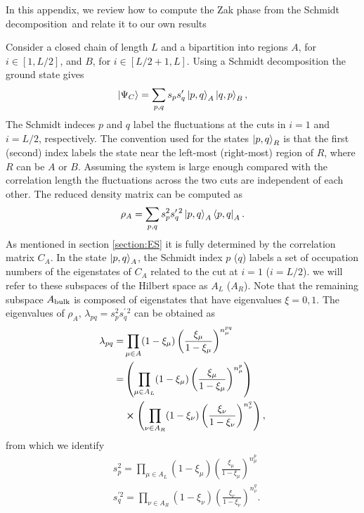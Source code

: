 \documentclass[twocolumn,amsmath,longbibliography,amssymb,superscriptaddress]{revtex4-1}
\newcommand{\maria}[1]{{\color{blue} #1}}
\begin{document}
\maria{In this appendix, we review  how to compute the Zak phase from the Schmidt decomposition~\cite{Zaletel2014}and relate it to our own results}


Consider a closed chain of length $L$ and a bipartition into regions $A$, for $i\in [1,L/2]$, and $B$, for $i \in [L/2+1,L]$. Using a Schmidt decomposition the ground state gives
\begin{equation}
\ket{\Psi_C} = \sum_{p,q} s_p s'_q \ket{p,q}_A \ket{q,p}_B,
\end{equation}
The Schmidt indeces $p$ and $q$ label the fluctuations at the cuts in $i=1$ and $i=L/2$, respectively. The convention used for the states $\ket{p,q}_{R}$ is that the first (second) index labels the state near the left-most (right-most) region of $R$, where $R$ can be $A$ or $B$. Assuming the system is large enough compared with the correlation length the fluctuations across the two cuts are independent of each other. The reduced density matrix can be computed as
\begin{equation}
\rho_A = \sum_{p,q} s_p^2 s^{\prime \, 2}_q \ket{p,q}_{A}\bra{p,q}_A .
\end{equation}
As mentioned in section \ref{section:ES} it is fully determined by the correlation matrix $C_A$. In the state $\ket{p,q}_A$, the Schmidt index $p$ ($q$) labels a set of occupation numbers of the eigenstates of $C_A$ related to the cut at $i=1$ ($i=L/2$). we will refer to these subspaces of the Hilbert space as $A_L$ ($A_R$). Note that the remaining subspace $A_{\rm bulk}$ is composed of eigenstates that have eigenvalues $\xi = 0,1$. The eigenvalues of $\rho_A$, $\lambda_{pq}=s_p^2 s_q^{\prime \, 2}$ can be obtained as
\begin{align}
\lambda_{pq} =& \prod_{\mu \in A} (1-\xi_\mu)\left(\frac{\xi_\mu}{1-\xi_\mu}\right)^{n_\mu^{pq}} \\
=&\left(\prod_{\mu\in A_L} (1-\xi_\mu)\left(\frac{\xi_\mu}{1-\xi_\mu}\right)^{n_\mu^{p}} \right) \\
&\cross \left(\prod_{\nu \in A_R} (1-\xi_\nu)\left(\frac{\xi_\nu}{1-\xi_\nu}\right)^{n_\nu^{q}} \right) ,
\label{eq:Alexandrinata}
\end{align}
from which we identify 
\begin{align*}
&s_p^2 = \prod_{\mu\in A_L} (1-\xi_\mu)\left(\frac{\xi_\mu}{1-\xi_\mu}\right)^{n_\mu^{p}} \\
&s_q^{\prime 2} = \prod_{\nu \in A_R} (1-\xi_\nu)\left(\frac{\xi_\nu}{1-\xi_\nu}\right)^{n_\nu^{q}}.
\label{eq:spsq_A}
\end{align*}
\end{document}
